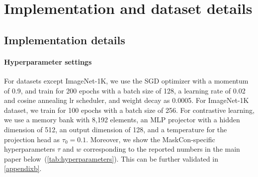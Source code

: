 \documentclass[10pt,twocolumn,letterpaper]{article}
\begin{document}
\section{Implementation and dataset details}\label{appendixa}
\subsection{Implementation details}

\paragraph{Hyperparameter settings}
For datasets except ImageNet-1K, we use the SGD optimizer with a momentum of 0.9, and train for 200 epochs with a batch size of 128, a learning rate of 0.02 and cosine annealing lr scheduler, and weight decay as 0.0005. For ImageNet-1K dataset, we train for 100 epochs with a batch size of 256. For contrastive learning, we use a memory bank with 8,192 elements, an MLP projector with a hidden dimension of 512, an output dimension of 128, and a temperature for the projection head as $\tau_0=0.1$. Moreover, we show the MaskCon-specific hyperparameters $\tau$ and $w$ corresponding to the reported numbers in the main paper below~(\cref{tab:hyperparameters}). This can be further validated in \cref{appendixb}.
\begin{table}[htbp]
\centering
{}
\caption{Hyperparameters in the main paper.}
\label{tab:hyperparameters}
\end{table}
\end{document}
